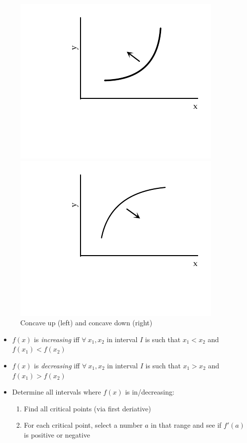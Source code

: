 \begin{figure}[h]
\centering
\begin{minipage}{.5\linewidth}
  \centering
  \includegraphics[trim={0 45pt 0 0},clip,width=.8\linewidth]{concave_up}
\end{minipage}%
\begin{minipage}{.5\linewidth}
  \centering
  \includegraphics[trim={0 45pt 0 0},clip,width=.8\linewidth]{concave_down}
\end{minipage}
\caption{Concave up (left) and concave down (right)}
\end{figure}
\hformbar




\begin{itemize}
    \item $f(x)$ is \textit{increasing} iff $\forall~ x_1, x_2$ in interval $I$ is such that $x_1 < x_2$ and $f(x_1) < f(x_2)$
    \item $f(x)$ is \textit{decreasing} iff $\forall~ x_1, x_2$ in interval $I$ is such that $x_1 > x_2$ and $f(x_1) > f(x_2)$
    \item Determine all intervals where $f(x)$ is in/decreasing:
    \begin{enumerate}
        \item Find all critical points (via first deriative)
        \item For each critical point, select a number $a$ in that range and see if $f'(a)$ is positive or negative
    \end{enumerate}
\end{itemize}


